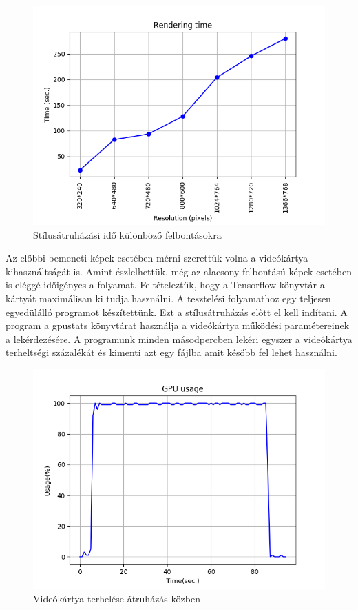 \documentclass[12pt, a4paper, oneside]{book}
\theoremstyle{tetel}
\begin{document}
\begin{figure}[!htbp]
	\begin{center}
		\includegraphics[scale=0.8]{time_per_res.png}
		\caption{Stílusátruházási idő különböző felbontásokra}
		\label{time_per_res}
	\end{center}
\end{figure}

Az előbbi bemeneti képek esetében mérni szerettük volna a videókártya kihasználtságát is. Amint észlelhettük, még az alacsony felbontású képek esetében is eléggé időigényes a folyamat. Feltételeztük, hogy a Tensorflow könyvtár a kártyát maximálisan ki tudja használni. A tesztelési folyamathoz egy teljesen egyedülálló programot készítettünk. Ezt a stílusátruházás előtt el kell indítani. A program a gpustats\cite{36} könyvtárat használja a videókártya működési paramétereinek a lekérdezésére. A programunk minden másodpercben lekéri egyszer a videókártya terheltségi százalékát és kimenti azt egy fájlba amit később fel lehet használni.

\begin{figure}[!htbp]
	\begin{center}
		\includegraphics[scale=0.8]{gpu_usage.png}
		\caption{Videókártya terhelése átruházás közben}
		\label{gpu_usage}
	\end{center}
\end{figure}
\end{document}
